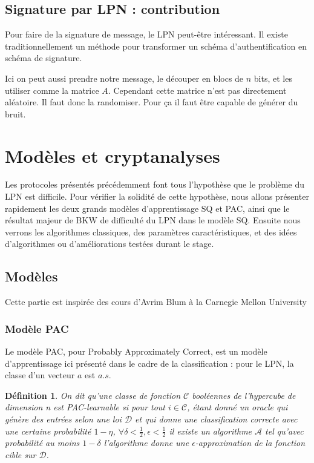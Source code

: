 \documentclass{article}		%
\newtheorem{defi}{Définition}
\theoremstyle{definition}
\theoremstyle{plain}
\theoremstyle{plain}
\theoremstyle{plain}
\theoremstyle{plain}
\begin{document}
\subsection{Signature par LPN : contribution}
Pour faire de la signature de message, le LPN peut-être intéressant. Il
existe traditionnellement un méthode pour transformer un schéma
d'authentification en schéma de signature.

Ici on peut aussi prendre notre message, le découper en blocs de $n$
bits, et les utiliser comme la matrice $A$. Cependant cette matrice n'est
pas directement aléatoire. Il faut donc la randomiser. Pour ça il faut
être capable de générer du bruit.

\section{Modèles et cryptanalyses}
Les protocoles présentés précédemment font tous l'hypothèse que le
problème du LPN est difficile. Pour vérifier la solidité de cette
hypothèse,   nous allons
présenter rapidement les deux grands modèles d'apprentissage SQ et PAC, ainsi que le
résultat majeur de BKW de difficulté du LPN dans le modèle SQ. Ensuite
nous verrons les algorithmes classiques, des paramètres caractéristiques,
et des idées d'algorithmes ou d'améliorations testées durant le stage.

\subsection{Modèles}
Cette partie est inspirée des cours d'Avrim
Blum à la Carnegie Mellon University
\subsubsection{Modèle PAC}
Le modèle PAC, pour Probably Approximately Correct, est un modèle
d'apprentissage ici présenté dans le cadre de la
classification : pour le LPN, la classe d'un vecteur $a$ est
$a.s$.
\begin{defi}
On dit qu'une classe de fonction $\mathcal{C}$ booléennes de l'hypercube
de dimension n est PAC-learnable si pour tout $i\in\mathcal{C}$, étant donné un oracle qui génère des
entrées
selon une loi $\mathcal{D}$ et qui donne une classification correcte avec une
certaine probabilité $1-\eta$, $\forall
\delta<\frac{1}{2}, \epsilon<\frac{1}{2}$ il existe un algorithme
$\mathcal{A}$ tel qu'avec probabilité au moins $1-\delta$ l'algorithme donne une
$\epsilon$-approximation de la fonction cible sur $\mathcal{D}$. 
\end{defi}
\end{document}
